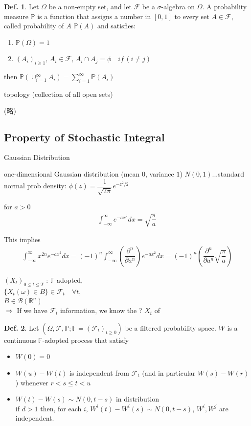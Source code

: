 \documentclass[a4paper,11pt]{jsarticle}
\theoremstyle{definition}
\newtheorem{definition}{Def.}[subsection]
\newcommand{\df}[2]{\dfrac{#1}{#2}}
\newcommand{\intinf}{\int_{-\infty}^{\infty}}
\begin{document}
\begin{definition}
  Let $\Omega$ be a non-empty set, and let $\mathcal{F}$ be
  a $\sigma$-algebra on $\Omega$. A probability measure
  $\mathbb{P}$ is a function that assigns a number in $[0,1]$
  to every set $A\in\mathcal{F}$, called probability of $A$
  $\mathbb{P}(A)$ and satisfies:
  \begin{enumerate}
    \item $\mathbb{P}(\Omega)=1$
    \item $(A_i)_{i\geq 1},\, A_i\in\mathcal{F},\,
    A_i \cap A_j = \phi \quad if \, (i\neq j)$
  \end{enumerate}
  then $\mathbb{P}\left(\cup_{i=1}^{\infty} A_i\right)
  =\sum_{i=1}^{\infty}\mathbb{P}(A_i)$
\end{definition}

topology (collection of all open sets)

(略)





\subsection{Property of Stochastic Integral}
Gaussian Distribution

one-dimensional Gaussian distribution
(mean $0$, variance $1$)
$N(0,1)$...standard normal
prob density:
$\phi(z)=\df{1}{\sqrt{2\pi}}e^{-z^2/2}$

for $a>0$
\begin{align}
  \intinf e^{-ax^2}dx=\sqrt{\df{\pi}{a}}
\end{align}

This implies
\begin{align}
  \intinf x^{2n}e^{-ax^2}dx
  =(-1)^n\intinf \left(
  \df{\partial^n}{\partial a^n} \right)
  e^{-ax^2}dx
  =(-1)^n\left(\df{\partial^n}{\partial a^n}
  \sqrt{\df{\pi}{a}}\right)
\end{align}

$(X_t)_{0\leq t\leq T}$ : $\mathbb{F}$-adopted, \\
$\{X_t(\omega)\in B\}\in \mathcal{F}_t \quad \forall t$,\\
$B\in\mathcal{B}(\mathbb{R}^n)$\\
$\Rightarrow$ If we have $\mathcal{F}_t$ information,
we know the ? $X_t$ of



\begin{definition}
  Let $(\Omega, \mathcal{F},\mathbb{P};
  \mathbb{F}=(\mathcal{F}_t)_{t\geq 0} )$
  be a filtered probability space.
  $W$ is a continuous $\mathbb{F}$-adopted process that satisfy
  \begin{itemize}
    \item $W(0)=0$
    \item $W(u)-W(t)$ is independent from $\mathcal{F}_t$
    (and in particular $W(s)-W(r)$) whenever $r<s\leq t<u$
    \item $W(t)-W(s)\sim N(0,t-s)$ in distribution\\
    if $d>1$ then, for each $i$, $W^i(t)-W^i(s)\sim N(0,t-s)$,
    $W^i, W^j$ are independent.
  \end{itemize}
\end{definition}
\end{document}
